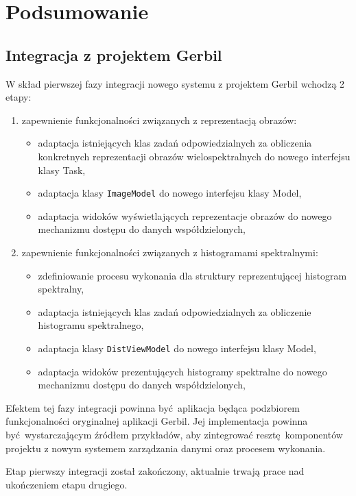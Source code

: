 \chapter{Podsumowanie}

\section{Integracja z projektem Gerbil}
W skład pierwszej fazy integracji nowego systemu z projektem Gerbil wchodzą 2 etapy:

\begin{enumerate}[labelwidth=\widthof{\ref{last-item2}},label=\arabic*.]
	\item zapewnienie funkcjonalności związanych z reprezentacją obrazów:
		\begin{itemize}
			\item adaptacja istniejących klas zadań odpowiedzialnych za obliczenia konkretnych reprezentacji obrazów wielospektralnych do nowego interfejsu klasy Task,
			\item adaptacja klasy \lstinline$ImageModel$ do nowego interfejsu klasy Model,
			\item adaptacja widoków wyświetlających reprezentacje obrazów do nowego mechanizmu dostępu do danych współdzielonych,
		\end{itemize}
	\item zapewnienie funkcjonalności związanych z histogramami spektralnymi:
	\begin{itemize}
		\item zdefiniowanie procesu wykonania dla struktury reprezentującej histogram spektralny,
		\item adaptacja istniejących klas zadań odpowiedzialnych za obliczenie histogramu spektralnego,
		\item adaptacja klasy \lstinline$DistViewModel$ do nowego interfejsu klasy Model,
		\item adaptacja widoków prezentujących histogramy spektralne do nowego mechanizmu dostępu do danych współdzielonych,
	\end{itemize}
\end{enumerate}

Efektem tej fazy integracji powinna być aplikacja będąca podzbiorem funkcjonalności oryginalnej aplikacji Gerbil. Jej implementacja powinna być wystarczającym źródłem przykładów, aby zintegrować resztę komponentów projektu z nowym systemem zarządzania danymi oraz procesem wykonania.

Etap pierwszy integracji został zakończony, aktualnie trwają prace nad ukończeniem etapu drugiego.

